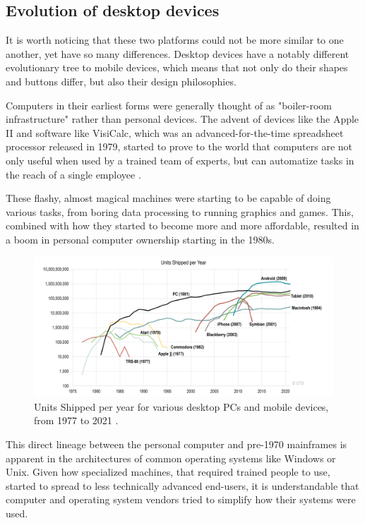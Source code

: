 \subsection{Evolution of desktop devices}

It is worth noticing that these two platforms could not be more similar to one another, yet have so many differences. Desktop devices have a notably different evolutionary tree to mobile devices, which means that not only do their shapes and buttons differ, but also their design philosophies.

Computers in their earliest forms were generally thought of as "boiler-room infrastructure" rather than personal devices. The advent of devices like the Apple II and software like VisiCalc, which was an advanced-for-the-time spreadsheet processor released in 1979, started to prove to the world that computers are not only useful when used by a trained team of experts, but can automatize tasks in the reach of a single employee \cite{NYBirthPC}.

These flashy, almost magical machines were starting to be capable of doing various tasks, from boring data processing to running graphics and games. This, combined with how they started to become more and more affordable, resulted in a boom in personal computer ownership starting in the 1980s.

\begin{figure}[htbp]
    \centering
    \includegraphics[width=\textwidth]{./figures/ch2_historical_pc_usage.png}
    \caption{Units Shipped per year for various desktop PCs and mobile devices, from 1977 to 2021 \cite{TGPCHis}.}
    \label{FigHistoricalPC}
\end{figure}

This direct lineage between the personal computer and pre-1970 mainframes is apparent in the architectures of common operating systems like Windows or Unix. Given how specialized machines, that required trained people to use, started to spread to less technically advanced end-users, it is understandable that computer and operating system vendors tried to simplify how their systems were used.

